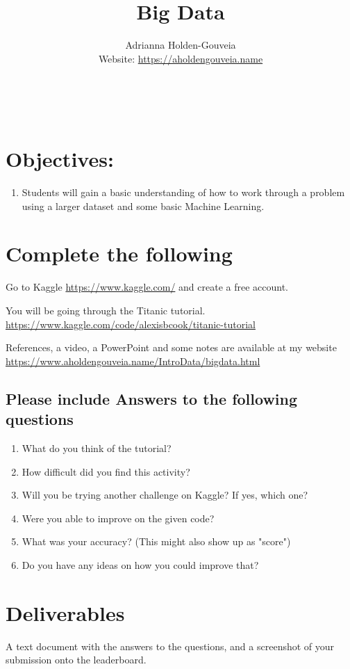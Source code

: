 \documentclass[12pt]{article}
\title{Big Data}
\author{
        Adrianna Holden-Gouveia \\
        Website: \url{https://aholdengouveia.name}\\ 
        \date{\vspace{-5ex}}
        \faLinkedin{: aholdengouveia} \\
        \faGithub {: aholdengouveia} \\
        }
\begin{document}
    

\maketitle


\section*{Objectives:}
\begin{enumerate}
    \item Students will gain a basic understanding of how to work through a problem using a larger dataset and some basic Machine Learning. 
\end{enumerate}
\section*{Complete the following}

Go to Kaggle \url{https://www.kaggle.com/} and create a free account.  

You will be going through the Titanic tutorial. \url{https://www.kaggle.com/code/alexisbcook/titanic-tutorial}

References, a video, a PowerPoint and some notes are available at my website
\url {https://www.aholdengouveia.name/IntroData/bigdata.html}

\subsection*{Please include Answers to the following questions}
    \begin{enumerate}
        \item What do you think of the tutorial?
        \item How difficult did you find this activity?
        \item Will you be trying another challenge on Kaggle? If yes, which one?
        \item Were you able to improve on the given code? 
        \item What was your accuracy?  (This might also show up as "score")
        \item Do you have any ideas on how you could improve that?


    \end{enumerate}



\section*{Deliverables}
A text document with the answers to the questions, and a screenshot of your submission onto the leaderboard. 
\end{document}

